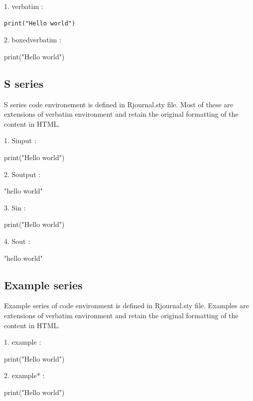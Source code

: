 1. verbatim :

\begin{verbatim}
print("Hello world")
\end{verbatim}


2. boxedverbatim :

\begin{boxedverbatim}
print("Hello world")
\end{boxedverbatim}


\subsection{S series}

S series code environement is defined in Rjournal.sty file. Most of these are
extensions of verbatim environment and retain the original formatting of the content
in HTML.

1. Sinput :

\begin{Sinput}
print("Hello world")
\end{Sinput}


2. Soutput :

\begin{Soutput}
[1] "hello world"
\end{Soutput}


3. Sin :

\begin{Sin}
print("Hello world")
\end{Sin}


4. Sout :
\begin{Sout}
[1] "hello world"
\end{Sout}


\subsection{Example series}
Example series of code environment is defined in Rjournal.sty file. Examples are
extensions of verbatim environment and retain the original formatting of the content
in HTML.

1. example :

\begin{example}
print("Hello world")
\end{example}


2. example* :

\begin{example*}
print("Hello world")
\end{example*}


